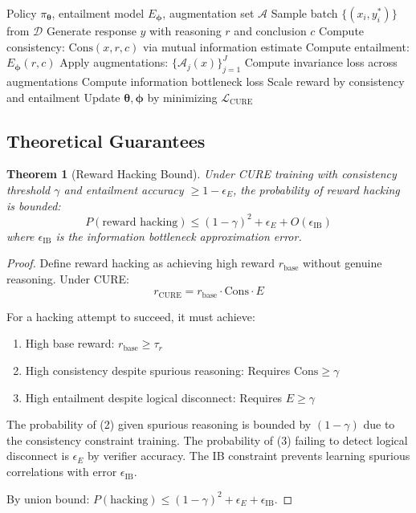 \documentclass[11pt,a4paper]{article}
\newtheorem{theorem}{Theorem}[section]
\newcommand{\calL}{\mathcal{L}}
\newcommand{\calD}{\mathcal{D}}
\newcommand{\calA}{\mathcal{A}}
\newcommand{\btheta}{\bm{\theta}}
\newcommand{\bphi}{\bm{\phi}}
\begin{document}
\begin{algorithm}[t]
\caption{CURE Training}
\label{alg:cure}
\begin{algorithmic}[1]
\REQUIRE Policy $\pi_\btheta$, entailment model $E_\bphi$, augmentation set $\calA$
    \STATE Sample batch $\{(x_i, y_i^*)\}$ from $\calD$
        \STATE Generate response $y$ with reasoning $r$ and conclusion $c$
        \STATE Compute consistency: $\text{Cons}(x, r, c)$ via mutual information estimate
        \STATE Compute entailment: $E_\bphi(r, c)$
        \STATE Apply augmentations: $\{\calA_j(x)\}_{j=1}^J$
        \STATE Compute invariance loss across augmentations
        \STATE Compute information bottleneck loss
        \STATE Scale reward by consistency and entailment
    \ENDFOR
    \STATE Update $\btheta, \bphi$ by minimizing $\calL_{\text{CURE}}$
\ENDFOR
\end{algorithmic}
\end{algorithm}

\subsection{Theoretical Guarantees}

\begin{theorem}[Reward Hacking Bound]
\label{thm:cure_hacking}
Under CURE training with consistency threshold $\gamma$ and entailment accuracy $\geq 1-\epsilon_E$, the probability of reward hacking is bounded:
\begin{equation}
    P(\text{reward hacking}) \leq (1-\gamma)^2 + \epsilon_E + O(\epsilon_{\text{IB}})
\end{equation}
where $\epsilon_{\text{IB}}$ is the information bottleneck approximation error.
\end{theorem}

\begin{proof}
Define reward hacking as achieving high reward $r_{\text{base}}$ without genuine reasoning. Under CURE:
\begin{equation}
    r_{\text{CURE}} = r_{\text{base}} \cdot \text{Cons} \cdot E
\end{equation}

For a hacking attempt to succeed, it must achieve:
\begin{enumerate}
    \item High base reward: $r_{\text{base}} \geq \tau_r$
    \item High consistency despite spurious reasoning: Requires $\text{Cons} \geq \gamma$
    \item High entailment despite logical disconnect: Requires $E \geq \gamma$
\end{enumerate}

The probability of (2) given spurious reasoning is bounded by $(1-\gamma)$ due to the consistency constraint training. The probability of (3) failing to detect logical disconnect is $\epsilon_E$ by verifier accuracy. The IB constraint prevents learning spurious correlations with error $\epsilon_{\text{IB}}$.

By union bound: $P(\text{hacking}) \leq (1-\gamma)^2 + \epsilon_E + \epsilon_{\text{IB}}$.
\end{proof}
\end{document}
